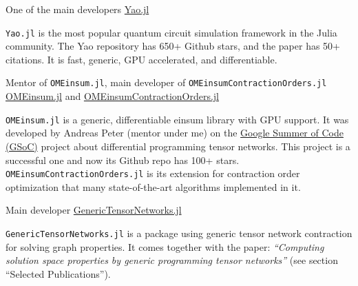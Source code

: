 \documentclass[11pt, a4paper]{awesome-cv}
\begin{document}
\begin{cventries}
  \cventry
    {One of the main developers} %
    {\href{https://github.com/QuantumBFS/Yao.jl}{Yao.jl}} %
    {} %
    {} %
    {
      \begin{cvitems} %
          {\texttt{Yao.jl} is the most popular quantum circuit simulation framework in the Julia community.
          The Yao repository has 650+ Github stars, and the paper has 50+ citations.
          It is fast, generic, GPU accelerated, and differentiable.
          }
      \end{cvitems}
    }
  \cventry
    {Mentor of \texttt{OMEinsum.jl}, main developer of \texttt{OMEinsumContractionOrders.jl}} %
    {\href{https://github.com/under-Peter/OMEinsum.jl}{OMEinsum.jl} and \href{OMEinsumContractionOrders.jl}{OMEinsumContractionOrders.jl}} %
    {}{}
    {
      \begin{cvitems} %
          {\texttt{OMEinsum.jl} is a generic, differentiable einsum library with GPU support. It was developed by Andreas Peter (mentor under me) on the \href{https://summerofcode.withgoogle.com/}{Google Summer of Code (GSoC)} project about differential programming tensor networks. This project is a successful one and now its Github repo has 100+ stars.
          \texttt{OMEinsumContractionOrders.jl} is its extension for contraction order optimization that many state-of-the-art algorithms implemented in it.}
      \end{cvitems}
    }

  \cventry
    {Main developer}
    {\href{https://github.com/QuEraComputing/GenericTensorNetworks.jl}{GenericTensorNetworks.jl}} %
    {}{}
    {
      \begin{cvitems} %
          {\texttt{GenericTensorNetworks.jl} is a package using generic tensor network contraction for solving graph properties. It comes together with the paper: \textit{``Computing solution space properties by generic programming tensor networks''} (see section ``Selected Publications'').}
      \end{cvitems}
    }

\end{cventries}
\end{document}
